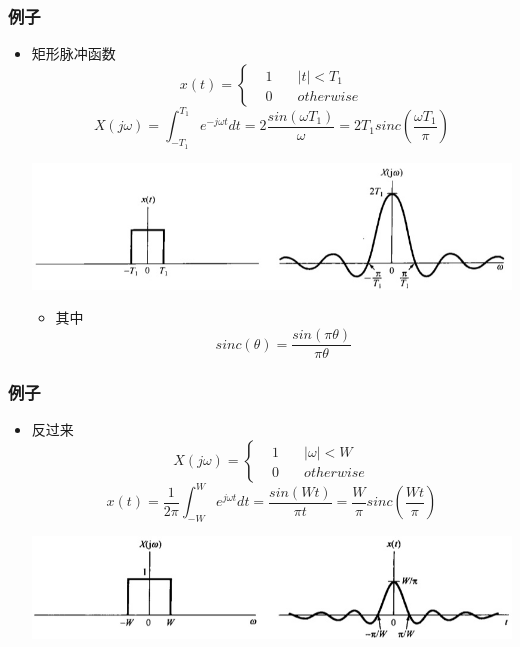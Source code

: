 \documentclass[CJKutf8,dvipsnames,table]{beamer}
\begin{document}
\begin{CJK*}{UTF8}{song}
\begin{frame}
  \end{frame}     
     
  \begin{frame}
    \frametitle{例子}
    \begin{itemize}
    \item 矩形脉冲函数
    \[
x(t) = 
\left\{
    \begin {aligned}
         & 1 \quad & |t| < T_1 \\
         & 0 \quad & otherwise                  
    \end{aligned}
\right.
	\]
	\[
		X(j\omega) = \int_{-T_1}^{T_1}e^{-j\omega t}dt = 2\frac{sin(\omega T_1)}{\omega}=2T_1sinc(\frac{\omega T_1}{\pi})
	\]
    
    	\begin{center}
      	\includegraphics[scale=.37]{ss-c-f4-8}
    	\end{center}
	
		\begin{itemize}
		\item 其中
    	\[
    		sinc(\theta) = \frac{sin(\pi\theta)}{\pi\theta}
    	\]	
		\end{itemize}
    \end{itemize}

  \end{frame}      
     
  \begin{frame}
    \frametitle{例子}
    \begin{itemize}
    \item 反过来
    \[
X(j\omega) = 
\left\{
    \begin {aligned}
         & 1 \quad & |\omega| < W \\
         & 0 \quad & otherwise                  
    \end{aligned}
\right.
	\]
	\[
		x(t) = \frac{1}{2\pi}\int_{-W}^{W}e^{j\omega t}dt = \frac{sin(W t)}{\pi t} = \frac{W}{\pi}sinc(\frac{Wt}{\pi})
	\]
    
    	\begin{center}
      	\includegraphics[scale=.37]{ss-c-f4-9}
    	\end{center}
	

\end{itemize}
\end{frame}
\end{CJK*}
\end{document}
